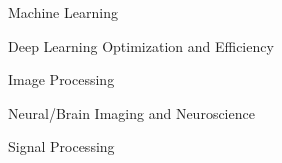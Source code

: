 


\begin{cventries}



{
\begin{cvitems}
\item {\vspace{-4.0mm}\fontsize{11}{12}\selectfont Machine Learning}
\item {\fontsize{11}{12}\selectfont Deep Learning Optimization and Efficiency}
\item {\fontsize{11}{12}\selectfont Image Processing}
\item {\fontsize{11}{12}\selectfont Neural/Brain Imaging and Neuroscience}
\item {\fontsize{11}{12}\selectfont Signal Processing}
\end{cvitems}
}


\end{cventries}
